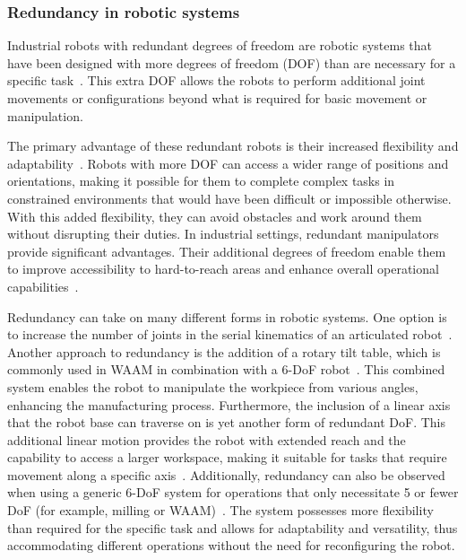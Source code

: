\subsubsection{Redundancy in robotic systems}

Industrial robots with redundant degrees of freedom are robotic systems that have been designed with more degrees of freedom (DOF) than are necessary for a specific task~\cite{Liu.2022}. This extra DOF allows the robots to perform additional joint movements or configurations beyond what is required for basic movement or manipulation.

The primary advantage of these redundant robots is their increased flexibility and adaptability~\cite{Duong.2021}. Robots with more DOF can access a wider range of positions and orientations, making it possible for them to complete complex tasks in constrained environments that would have been difficult or impossible otherwise. With this added flexibility, they can avoid obstacles and work around them without disrupting their duties. In industrial settings, redundant manipulators provide significant advantages. Their additional degrees of freedom enable them to improve accessibility to hard-to-reach areas and enhance overall operational capabilities~\cite{Shi.2021}. 

Redundancy can take on many different forms in robotic systems. One option is to increase the number of joints in the serial kinematics of an articulated robot~\cite{Milenkovic.2021}. Another approach to redundancy is the addition of a rotary tilt table, which is commonly used in WAAM in combination with a 6-DoF robot~\cite{Yuan.2020}. This combined system enables the robot to manipulate the workpiece from various angles, enhancing the manufacturing process.
Furthermore, the inclusion of a linear axis that the robot base can traverse on is yet another form of redundant DoF. This additional linear motion provides the robot with extended reach and the capability to access a larger workspace, making it suitable for tasks that require movement along a specific axis~\cite{Boscariol.2019}.
Additionally, redundancy can also be observed when using a generic 6-DoF system for operations that only necessitate 5 or fewer DoF (for example, milling or WAAM)~\cite{Hanafusa.1981,Liu.2022}. The system possesses more flexibility than required for the specific task and allows for adaptability and versatility, thus accommodating different operations without the need for reconfiguring the robot.



